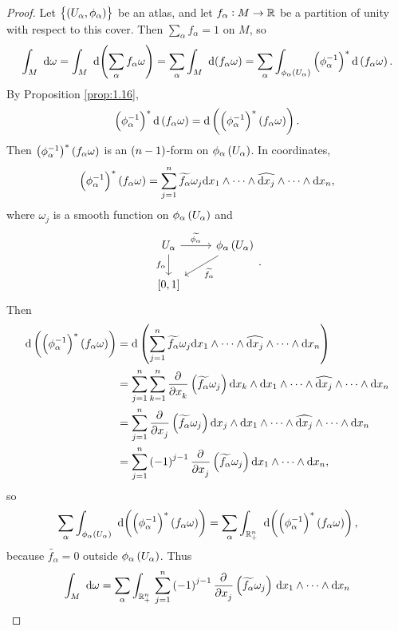 \begin{proof}
Let $ \cbr{\br{U_\alpha, \phi_\alpha}} $ be an atlas, and let $ f_\alpha : M \to \mathbb{R} $ be a partition of unity with respect to this cover. Then $ \sum_\alpha f_\alpha = 1 $ on $ M $, so
$$ \intd{M}{}{}{\omega} = \intd{M}{}{}{\br{\sum_\alpha f_\alpha\omega}} = \sum_\alpha \intd{M}{}{}{\br{f_\alpha\omega}} = \sum_\alpha \int_{\phi_\alpha\br{U_\alpha}} \br{\phi_\alpha^{-1}}^*\d\br{f_\alpha\omega}. $$
By Proposition \ref{prop:1.16},
$$ \br{\phi_\alpha^{-1}}^*\d\br{f_\alpha\omega} = \d\br{\br{\phi_\alpha^{-1}}^*\br{f_\alpha\omega}}. $$
Then $ \br{\phi_\alpha^{-1}}^*\br{f_\alpha\omega} $ is an $ \br{n - 1} $-form on $ \phi_\alpha\br{U_\alpha} $. In coordinates,
$$ \br{\phi_\alpha^{-1}}^*\br{f_\alpha\omega} = \sum_{j = 1}^n \widetilde{f_\alpha}\omega_j \d x_1 \wedge \dots \wedge \widehat{\d x_j} \wedge \dots \wedge \d x_n, $$
where $ \omega_j $ is a smooth function on $ \phi_\alpha\br{U_\alpha} $ and
$$
\begin{tikzcd}
U_\alpha \arrow{r}{\widetilde{\phi_\alpha}} \arrow[swap]{d}{f_\alpha} & \phi_\alpha\br{U_\alpha} \arrow{dl}{\widetilde{f_\alpha}} \\
\sbr{0, 1} &
\end{tikzcd}.
$$
Then
\begin{align*}
\d\br{\br{\phi_\alpha^{-1}}^*\br{f_\alpha\omega}}
& = \d\br{\sum_{j = 1}^n \widetilde{f_\alpha}\omega_j \d x_1 \wedge \dots \wedge \widehat{\d x_j} \wedge \dots \wedge \d x_n} \\
& = \sum_{j = 1}^n \sum_{k = 1}^n \dpd{}{x_k}\br{\widetilde{f_\alpha}\omega_j} \d x_k \wedge \d x_1 \wedge \dots \wedge \widehat{\d x_j} \wedge \dots \wedge \d x_n \\
& = \sum_{j = 1}^n \dpd{}{x_j}\br{\widetilde{f_\alpha}\omega_j} \d x_j \wedge \d x_1 \wedge \dots \wedge \widehat{\d x_j} \wedge \dots \wedge \d x_n \\
& = \sum_{j = 1}^n \br{-1}^{j - 1}\dpd{}{x_j}\br{\widetilde{f_\alpha}\omega_j} \d x_1 \wedge \dots \wedge \d x_n,
\end{align*}
so
$$ \sum_\alpha \intd{\phi_\alpha\br{U_\alpha}}{}{}{\br{\br{\phi_\alpha^{-1}}^*\br{f_\alpha\omega}}} = \sum_\alpha \intd{\RR_+^n}{}{}{\br{\br{\phi_\alpha^{-1}}^*\br{f_\alpha\omega}}}, $$
because $ \widetilde{f_\alpha} = 0 $ outside $ \phi_\alpha\br{U_\alpha} $. Thus
\begin{align*}
\intd{M}{}{}{\omega}
& = \sum_\alpha \intd{\RR_+^n}{}{\sum_{j = 1}^n \br{-1}^{j - 1}\dpd{}{x_j}\br{\widetilde{f_\alpha}\omega_j}}{x_1 \wedge \dots \wedge \d x_n} \\

\end{align*}
\end{proof}
